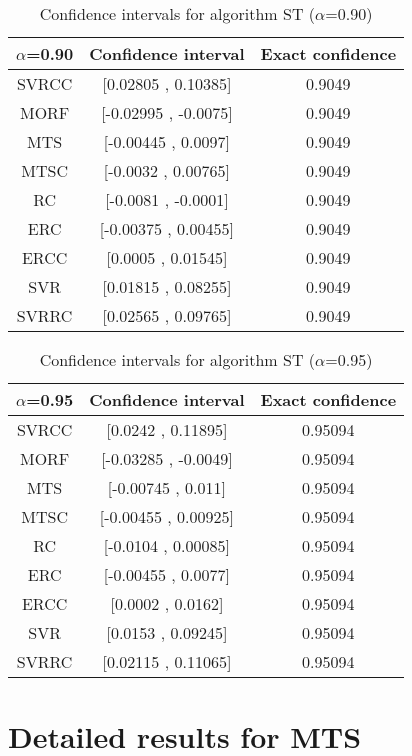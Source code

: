 \documentclass[a4paper,10pt]{article}
\begin{document}
\begin{table}[!htp]
\centering\small
\begin{tabular}{
|c|c|c|}
\hline
 $\alpha$=0.90 & Confidence interval & Exact confidence \\ \hline 
SVRCC & [0.02805 , 0.10385] & 0.9049\\ \hline 
MORF & [-0.02995 , -0.0075] & 0.9049\\ \hline 
MTS & [-0.00445 , 0.0097] & 0.9049\\ \hline 
MTSC & [-0.0032 , 0.00765] & 0.9049\\ \hline 
RC & [-0.0081 , -0.0001] & 0.9049\\ \hline 
ERC & [-0.00375 , 0.00455] & 0.9049\\ \hline 
ERCC & [0.0005 , 0.01545] & 0.9049\\ \hline 
SVR & [0.01815 , 0.08255] & 0.9049\\ \hline 
SVRRC & [0.02565 , 0.09765] & 0.9049\\ \hline 

\end{tabular}
\caption{Confidence intervals for algorithm ST ($\alpha$=0.90)}
\end{table}
\begin{table}[!htp]
\centering\small
\begin{tabular}{
|c|c|c|}
\hline
 $\alpha$=0.95 & Confidence interval & Exact confidence \\ \hline 
SVRCC & [0.0242 , 0.11895] & 0.95094\\ \hline 
MORF & [-0.03285 , -0.0049] & 0.95094\\ \hline 
MTS & [-0.00745 , 0.011] & 0.95094\\ \hline 
MTSC & [-0.00455 , 0.00925] & 0.95094\\ \hline 
RC & [-0.0104 , 0.00085] & 0.95094\\ \hline 
ERC & [-0.00455 , 0.0077] & 0.95094\\ \hline 
ERCC & [0.0002 , 0.0162] & 0.95094\\ \hline 
SVR & [0.0153 , 0.09245] & 0.95094\\ \hline 
SVRRC & [0.02115 , 0.11065] & 0.95094\\ \hline 

\end{tabular}
\caption{Confidence intervals for algorithm ST ($\alpha$=0.95)}
\end{table}

 \clearpage 


\section{Detailed results for MTS}
\end{document}
